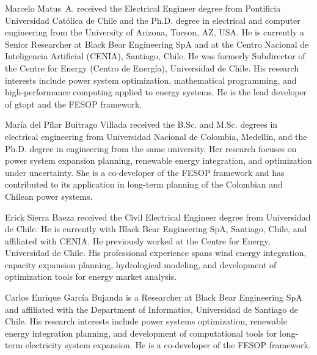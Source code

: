 \documentclass[journal]{IEEEtran}
\begin{document}




\begin{IEEEbiography}{Marcelo Matus~A.}
  received the Electrical Engineer degree from Pontificia Universidad
  Cat\'olica de Chile and the Ph.D. degree in electrical and computer
  engineering from the University of Arizona, Tucson, AZ, USA.  He is
  currently a Senior Researcher at Black Bear Engineering SpA and at
  the Centro Nacional de Inteligencia Artificial (CENIA), Santiago,
  Chile.  He was formerly Subdirector of the Centre for Energy (Centro
  de Energ\'ia), Universidad de Chile.  His research interests include
  power system optimization, mathematical programming, and
  high-performance computing applied to energy systems.  He is the
  lead developer of gtopt and the FESOP framework.
\end{IEEEbiography}

\begin{IEEEbiography}{Mar\'ia del Pilar Buitrago Villada}
  received the B.Sc. and M.Sc. degrees in electrical engineering from
  Universidad Nacional de Colombia, Medell\'in, and the Ph.D. degree in
  engineering from the same university.  Her research focuses on power
  system expansion planning, renewable energy integration, and
  optimization under uncertainty.  She is a co-developer of the FESOP
  framework and has contributed to its application in long-term planning
  of the Colombian and Chilean power systems.
\end{IEEEbiography}

\begin{IEEEbiography}{Erick Sierra Baeza}
  received the Civil Electrical Engineer degree from Universidad de Chile.
  He is currently with Black Bear Engineering SpA, Santiago, Chile, and
  affiliated with CENIA.  He previously worked at the Centre for Energy,
  Universidad de Chile.  His professional experience spans wind energy
  integration, capacity expansion planning, hydrological modeling, and
  development of optimization tools for energy market analysis.
\end{IEEEbiography}

\begin{IEEEbiography}{Carlos Enrique Garc\'ia Bujanda}
  is a Researcher at Black Bear Engineering SpA and affiliated with the
  Department of Informatics, Universidad de Santiago de Chile.  His
  research interests include power systems optimization, renewable energy
  integration planning, and development of computational tools for
  long-term electricity system expansion.  He is a co-developer of the
  FESOP framework.
\end{IEEEbiography}
\end{document}
